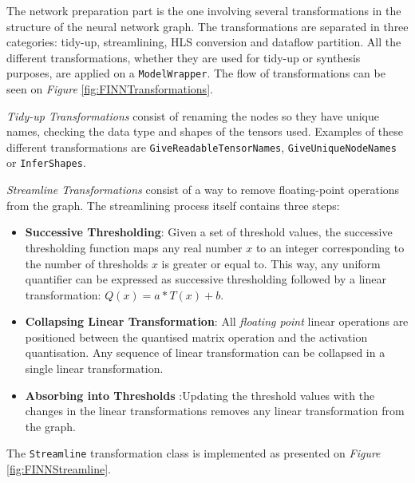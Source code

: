 The network preparation part is the one involving several transformations in the structure of the neural network graph. The transformations are separated in three categories: tidy-up, streamlining, HLS conversion and dataflow partition. All the different transformations, whether they are used for tidy-up or synthesis purposes, are applied on a \texttt{ModelWrapper}. The flow of transformations can be seen on \emph{Figure} \ref{fig:FINNTransformations}.

\emph{Tidy-up Transformations} consist of renaming the nodes so they have unique names, checking the data type and shapes of the tensors used. Examples of these different transformations are \texttt{GiveReadableTensorNames}, \texttt{GiveUniqueNodeNames} or \texttt{InferShapes}.

\emph{Streamline Transformations} consist of a way to remove floating-point operations from the graph. The streamlining process itself contains three steps:
\begin{itemize}
  \item \textbf{Successive Thresholding}: Given a set of threshold values, the successive thresholding function maps any real number $x$ to an integer corresponding to the number of thresholds $x$ is greater or equal to. This way, any uniform quantifier can be expressed as successive thresholding followed by a linear transformation: $Q(x) = a*T(x) + b$.
  \item \textbf{Collapsing Linear Transformation}: All \emph{floating point} linear operations are positioned between the quantised matrix operation and the activation quantisation. Any sequence of linear transformation can be collapsed in a single linear transformation.
  \item \textbf{Absorbing into Thresholds} :Updating the threshold values with the changes in the linear transformations removes any linear transformation from the graph.
\end{itemize}

The \texttt{Streamline} transformation class is implemented as presented on \emph{Figure} \ref{fig:FINNStreamline}.

